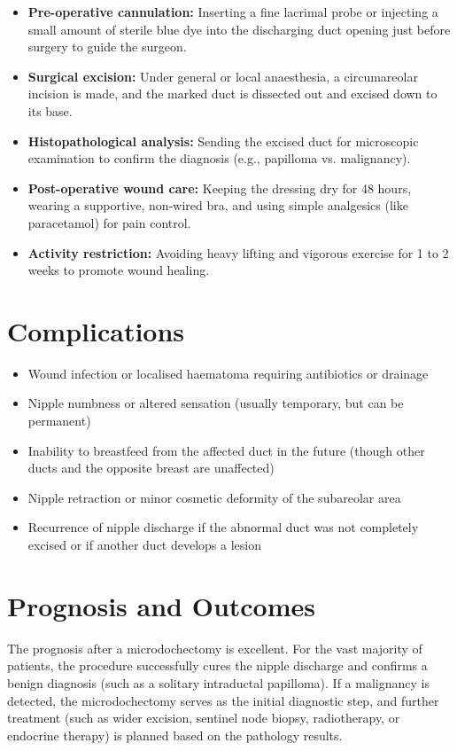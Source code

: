 \begin{itemize}
    \item \textbf{Pre-operative cannulation:} Inserting a fine lacrimal probe or injecting a small amount of sterile blue dye into the discharging duct opening just before surgery to guide the surgeon.
    \item \textbf{Surgical excision:} Under general or local anaesthesia, a circumareolar incision is made, and the marked duct is dissected out and excised down to its base.
    \item \textbf{Histopathological analysis:} Sending the excised duct for microscopic examination to confirm the diagnosis (e.g., papilloma vs. malignancy).
    \item \textbf{Post-operative wound care:} Keeping the dressing dry for 48 hours, wearing a supportive, non-wired bra, and using simple analgesics (like paracetamol) for pain control.
    \item \textbf{Activity restriction:} Avoiding heavy lifting and vigorous exercise for 1 to 2 weeks to promote wound healing.
\end{itemize}

\section*{Complications}
\begin{itemize}
    \item Wound infection or localised haematoma requiring antibiotics or drainage
    \item Nipple numbness or altered sensation (usually temporary, but can be permanent)
    \item Inability to breastfeed from the affected duct in the future (though other ducts and the opposite breast are unaffected)
    \item Nipple retraction or minor cosmetic deformity of the subareolar area
    \item Recurrence of nipple discharge if the abnormal duct was not completely excised or if another duct develops a lesion
\end{itemize}

\section*{Prognosis and Outcomes}
The prognosis after a microdochectomy is excellent. For the vast majority of patients, the procedure successfully cures the nipple discharge and confirms a benign diagnosis (such as a solitary intraductal papilloma). If a malignancy is detected, the microdochectomy serves as the initial diagnostic step, and further treatment (such as wider excision, sentinel node biopsy, radiotherapy, or endocrine therapy) is planned based on the pathology results.

